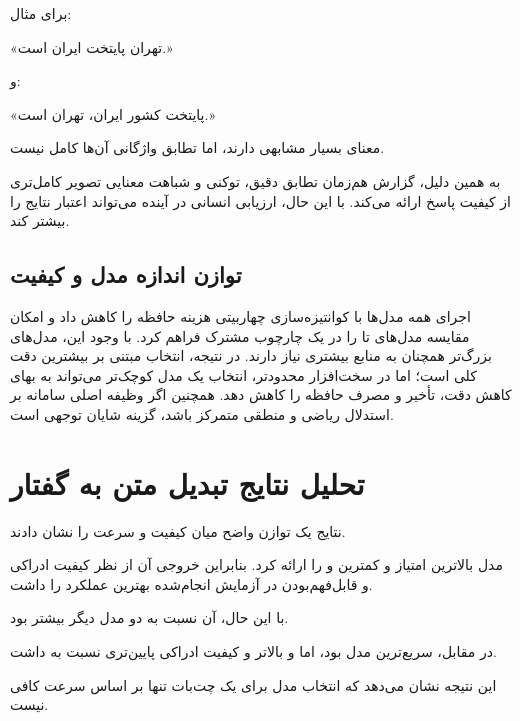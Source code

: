 برای مثال:

\begin{center}
«تهران پایتخت ایران است.»
\end{center}

و:

\begin{center}
«پایتخت کشور ایران، تهران است.»
\end{center}

معنای بسیار مشابهی دارند، اما تطابق واژگانی آن‌ها کامل نیست.

به همین دلیل، گزارش هم‌زمان تطابق دقیق،  توکنی و شباهت
معنایی تصویر کامل‌تری از کیفیت پاسخ ارائه می‌کند. با این حال،
ارزیابی انسانی در آینده می‌تواند اعتبار نتایج را بیشتر کند.


\subsection{توازن اندازه مدل و کیفیت}

اجرای همه مدل‌ها با کوانتیزه‌سازی چهاربیتی  هزینه حافظه را
کاهش داد و امکان مقایسه مدل‌های  تا  را در یک چارچوب
مشترک فراهم کرد. با وجود این، مدل‌های بزرگ‌تر همچنان به منابع
بیشتری نیاز دارند. در نتیجه،  انتخاب مبتنی بر بیشترین
دقت کلی است؛ اما در سخت‌افزار محدودتر، انتخاب یک مدل کوچک‌تر می‌تواند
به بهای کاهش دقت، تأخیر و مصرف حافظه را کاهش دهد. همچنین اگر وظیفه
اصلی سامانه بر استدلال ریاضی و منطقی متمرکز باشد، 
گزینه شایان توجهی است.


\section{تحلیل نتایج تبدیل متن به گفتار}

نتایج  یک توازن واضح میان کیفیت و سرعت را نشان دادند.

مدل  بالاترین امتیاز  و کمترین  و  را
ارائه کرد.
بنابراین خروجی آن از نظر کیفیت ادراکی و قابل‌فهم‌بودن در
آزمایش انجام‌شده بهترین عملکرد را داشت.

با این حال،  آن نسبت به دو مدل دیگر بیشتر بود.

در مقابل،  سریع‌ترین مدل بود، اما  و  بالاتر
و کیفیت ادراکی پایین‌تری نسبت به  داشت.

این نتیجه نشان می‌دهد که انتخاب مدل  برای یک چت‌بات
تنها بر اساس سرعت کافی نیست.


